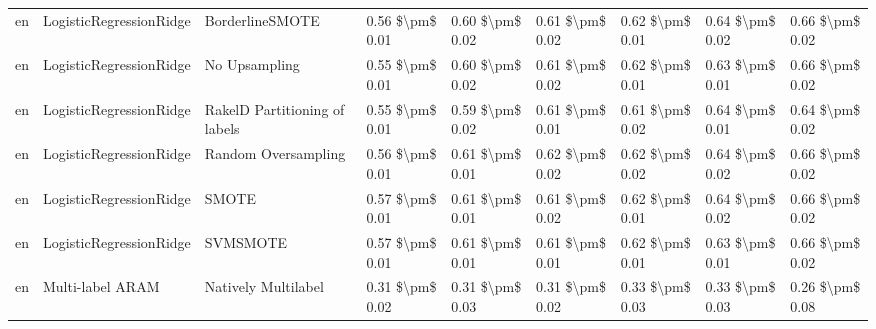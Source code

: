 \begin{tabular}{lllllllll}
      en &         LogisticRegressionRidge &               BorderlineSMOTE & 0.56 \$\textbackslash pm\$ 0.01 &           0.60 \$\textbackslash pm\$ 0.02 &       0.61 \$\textbackslash pm\$ 0.02 &        0.62 \$\textbackslash pm\$ 0.01 &                         0.64 \$\textbackslash pm\$ 0.02 &     0.66 \$\textbackslash pm\$ 0.02 \\
      en &         LogisticRegressionRidge &                 No Upsampling & 0.55 \$\textbackslash pm\$ 0.01 &           0.60 \$\textbackslash pm\$ 0.02 &       0.61 \$\textbackslash pm\$ 0.02 &        0.62 \$\textbackslash pm\$ 0.01 &                         0.63 \$\textbackslash pm\$ 0.01 &     0.66 \$\textbackslash pm\$ 0.02 \\
      en &         LogisticRegressionRidge & RakelD Partitioning of labels & 0.55 \$\textbackslash pm\$ 0.01 &           0.59 \$\textbackslash pm\$ 0.02 &       0.61 \$\textbackslash pm\$ 0.01 &        0.61 \$\textbackslash pm\$ 0.02 &                         0.64 \$\textbackslash pm\$ 0.01 &     0.64 \$\textbackslash pm\$ 0.02 \\
      en &         LogisticRegressionRidge &           Random Oversampling & 0.56 \$\textbackslash pm\$ 0.01 &           0.61 \$\textbackslash pm\$ 0.01 &       0.62 \$\textbackslash pm\$ 0.02 &        0.62 \$\textbackslash pm\$ 0.02 &                         0.64 \$\textbackslash pm\$ 0.02 &     0.66 \$\textbackslash pm\$ 0.02 \\
      en &         LogisticRegressionRidge &                         SMOTE & 0.57 \$\textbackslash pm\$ 0.01 &           0.61 \$\textbackslash pm\$ 0.01 &       0.61 \$\textbackslash pm\$ 0.02 &        0.62 \$\textbackslash pm\$ 0.01 &                         0.64 \$\textbackslash pm\$ 0.02 &     0.66 \$\textbackslash pm\$ 0.02 \\
      en &         LogisticRegressionRidge &                      SVMSMOTE & 0.57 \$\textbackslash pm\$ 0.01 &           0.61 \$\textbackslash pm\$ 0.01 &       0.61 \$\textbackslash pm\$ 0.01 &        0.62 \$\textbackslash pm\$ 0.01 &                         0.63 \$\textbackslash pm\$ 0.01 &     0.66 \$\textbackslash pm\$ 0.02 \\
      en &                Multi-label ARAM &           Natively Multilabel & 0.31 \$\textbackslash pm\$ 0.02 &           0.31 \$\textbackslash pm\$ 0.03 &       0.31 \$\textbackslash pm\$ 0.02 &        0.33 \$\textbackslash pm\$ 0.03 &                         0.33 \$\textbackslash pm\$ 0.03 &     0.26 \$\textbackslash pm\$ 0.08 \\

\end{tabular}
